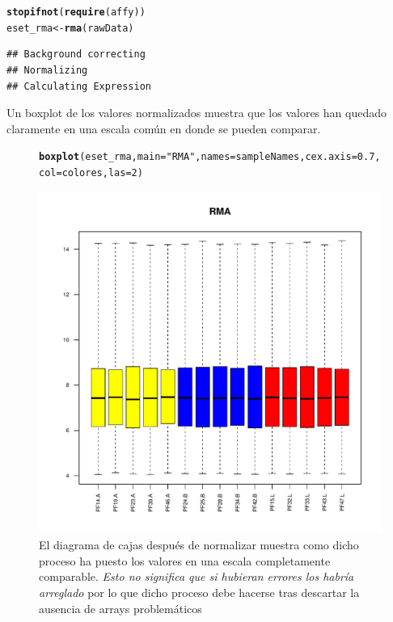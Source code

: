 \documentclass[a4paper]{article}\usepackage[]{graphicx}\usepackage[]{color}
\makeatletter
\def\maxwidth{ %
  \ifdim\Gin@nat@width>\linewidth
    \linewidth
  \else
    \Gin@nat@width
  \fi
}
\newcommand{\hlnum}[1]{\textcolor[rgb]{0.686,0.059,0.569}{#1}}%
\newcommand{\hlstr}[1]{\textcolor[rgb]{0.192,0.494,0.8}{#1}}%
\newcommand{\hlstd}[1]{\textcolor[rgb]{0.345,0.345,0.345}{#1}}%
\newcommand{\hlkwb}[1]{\textcolor[rgb]{0.69,0.353,0.396}{#1}}%
\newcommand{\hlkwc}[1]{\textcolor[rgb]{0.333,0.667,0.333}{#1}}%
\newcommand{\hlkwd}[1]{\textcolor[rgb]{0.737,0.353,0.396}{\textbf{#1}}}%
\newenvironment{kframe}{%
 \def\at@end@of@kframe{}%
 \ifinner\ifhmode%
  \def\at@end@of@kframe{\end{minipage}}%
  \begin{minipage}{\columnwidth}%
 \fi\fi%
 \def\FrameCommand##1{\hskip\@totalleftmargin \hskip-\fboxsep
 \colorbox{shadecolor}{##1}\hskip-\fboxsep
     \hskip-\linewidth \hskip-\@totalleftmargin \hskip\columnwidth}%
 \MakeFramed {\advance\hsize-\width
   \@totalleftmargin\z@ \linewidth\hsize
   \@setminipage}}%
 {\par\unskip\endMakeFramed%
 \at@end@of@kframe}
\newenvironment{knitrout}{}{} %
\makeatother
\begin{document}
\begin{knitrout}
\color{fgcolor}\begin{kframe}
\begin{alltt}
\hlkwd{stopifnot}\hlstd{(}\hlkwd{require}\hlstd{(affy))}
\hlstd{eset_rma} \hlkwb{<-} \hlkwd{rma}\hlstd{(rawData)}
\end{alltt}
\begin{verbatim}
## Background correcting
## Normalizing
## Calculating Expression
\end{verbatim}
\end{kframe}
\end{knitrout}

Un boxplot de los valores normalizados muestra que los valores han quedado claramente en una escala común en donde se pueden comparar.
\begin{figure}[htbp]
\centering
\begin{knitrout}
\color{fgcolor}\begin{kframe}
\begin{alltt}
\hlkwd{boxplot}\hlstd{(eset_rma,}\hlkwc{main}\hlstd{=}\hlstr{"RMA"}\hlstd{,} \hlkwc{names}\hlstd{=sampleNames,} \hlkwc{cex.axis}\hlstd{=}\hlnum{0.7}\hlstd{,} \hlkwc{col}\hlstd{=colores,}\hlkwc{las}\hlstd{=}\hlnum{2}\hlstd{)}
\end{alltt}
\end{kframe}
\includegraphics[width=\maxwidth]{images/graficnormBoxPlot-1} 

\end{knitrout}
\caption{El diagrama de cajas después de normalizar muestra como dicho proceso ha puesto los valores en una escala completamente comparable. \emph{Esto no significa que si hubieran errores los habría arreglado} por lo que dicho proceso debe hacerse tras descartar la ausencia de arrays problemáticos}
\label{fig:normboxplot}
\end{figure}
\end{document}
